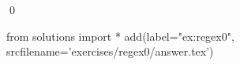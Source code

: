 
\begin{ex} 
  \label{ex:regex0}
  
  \qed
\end{ex} 
\begin{python0}
from solutions import *
add(label="ex:regex0",
    srcfilename='exercises/regex0/answer.tex') 
\end{python0}
